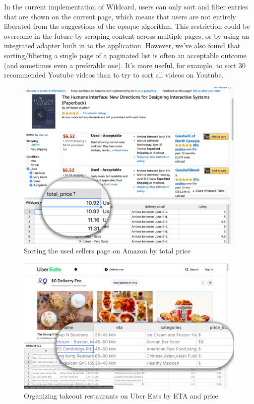 \documentclass[sigplan,screen,10pt,anonymous,review]{acmart}
\begin{document}
In the current implementation of Wildcard, users can only sort and
filter entries that are shown on the current page, which means that
users are not entirely liberated from the suggestions of the opaque
algorithm. This restriction could be overcome in the future by scraping
content across multiple pages, or by using an integrated adapter built
in to the application. However, we've also found that sorting/filtering
a single page of a paginated list is often an acceptable outcome (and
sometimes even a preferable one). It's more useful, for example, to sort
30 recommended Youtube videos than to try to sort all videos on Youtube.

\begin{figure}
\hypertarget{fig:amazon}{%
\centering
\includegraphics[width=\columnwidth]{media/amazon.png}
\caption{Sorting the used sellers page on Amazon by total price}\label{fig:amazon}
}
\end{figure}

\begin{figure}
\hypertarget{fig:ubereats}{%
\centering
\includegraphics[width=\columnwidth]{media/ubereats.png}
\caption{Organizing takeout restaurants on Uber Eats by ETA and price}\label{fig:ubereats}
}
\end{figure}
\end{document}
